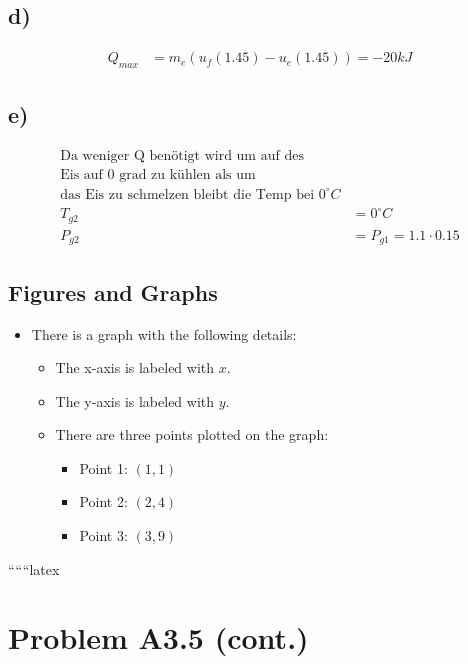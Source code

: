 

\subsection*{d)}
\begin{align*}
    Q_{max} &= m_e (u_f(1.45) - u_e(1.45)) = -20 kJ
\end{align*}

\subsection*{e)}
\begin{align*}
    \text{Da weniger Q benötigt wird um auf des} \\
    \text{Eis auf 0 grad zu kühlen als um} \\
    \text{das Eis zu schmelzen bleibt die Temp bei 0}^\circ C \\
    T_{g2} &= 0^\circ C \\
    P_{g2} &= P_{g1} = 1.1 \cdot 0.15
\end{align*}

\subsection*{Figures and Graphs}
\begin{itemize}
    \item There is a graph with the following details:
    \begin{itemize}
        \item The x-axis is labeled with $x$.
        \item The y-axis is labeled with $y$.
        \item There are three points plotted on the graph:
        \begin{itemize}
            \item Point 1: $(1, 1)$
            \item Point 2: $(2, 4)$
            \item Point 3: $(3, 9)$
        \end{itemize}
    \end{itemize}
\end{itemize}

``````latex


\section*{Problem A3.5 (cont.)}

